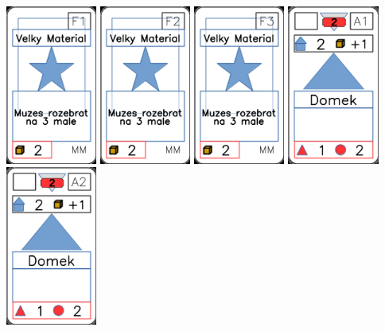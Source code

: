 \documentclass[a4paper]{article}
\begin{document}
	\includegraphics[width=3.0cm]{img-1_55}
	\includegraphics[width=3.0cm]{img-1_56}
	\includegraphics[width=3.0cm]{img-1_57}
	\includegraphics[width=3.0cm]{img-2_0}
	\includegraphics[width=3.0cm]{img-2_1}
\end{document}
